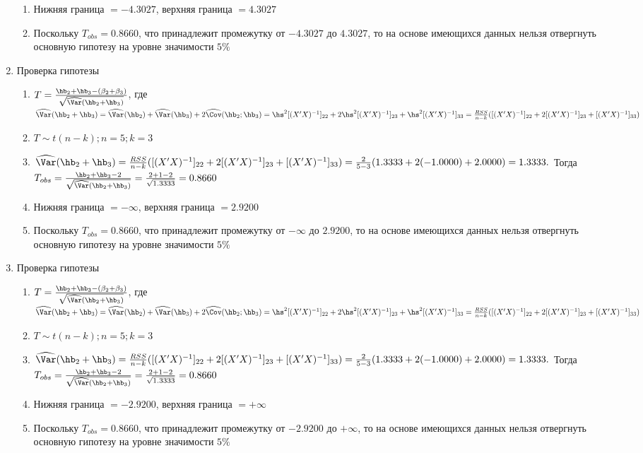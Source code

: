 \documentclass[pdftex,11pt,openany]{book}\usepackage[]{graphicx}\usepackage[]{color}
\begin{document}
\begin{solution}
\begin{enumerate}
\begin{enumerate}
\item Нижняя граница $= - 4.3027$, верхняя граница $= 4.3027$
\item Поскольку $T_{obs} = 0.8660$, что принадлежит промежутку от $- 4.3027$ до $4.3027$, то на основе имеющихся данных нельзя отвергнуть основную гипотезу на уровне значимости $5\%$
\end{enumerate}
\item Проверка гипотезы
\begin{enumerate}
\item $T = \frac{\hb_2 + \hb_3 - (\beta_2 + \beta_3)}{\sqrt{\widehat{\Var}(\hb_2 + \hb_3)}}$, где $\widehat{\Var}(\hb_2 + \hb_3) = \widehat{\Var}(\hb_2) + \widehat{\Var}(\hb_3) + 2\widehat{\Cov}(\hb_2;\hb_3) = \hs^2 [(X'X)^{-1}]_{22} + 2\hs^2 [(X'X)^{-1}]_{23} + \hs^2 [(X'X)^{-1}]_{33}= \frac{RSS}{n - k}([(X'X)^{-1}]_{22} + 2[(X'X)^{-1}]_{23} + [(X'X)^{-1}]_{33})$
\item $T \sim t(n-k); n = 5; k = 3$
\item $\widehat{\Var}(\hb_2 + \hb_3) = \frac{RSS}{n - k}([(X'X)^{-1}]_{22} + 2[(X'X)^{-1}]_{23} + [(X'X)^{-1}]_{33}) = \frac{2}{5 - 3} (1.3333 + 2(-1.0000) + 2.0000) = 1.3333.$ Тогда $T_{obs} = \frac{\hb_2 + \hb_3 - 2}{\sqrt{\widehat{\Var}(\hb_2 + \hb_3)}} = \frac{2 + 1 - 2}{\sqrt{1.3333}} = 0.8660$
\item Нижняя граница $= - \infty$, верхняя граница $= 2.9200$
\item Поскольку $T_{obs} = 0.8660$, что принадлежит промежутку от $- \infty$ до $2.9200$, то на основе имеющихся данных нельзя отвергнуть основную гипотезу на уровне значимости $5\%$
\end{enumerate}
\item Проверка гипотезы
\begin{enumerate}
\item $T = \frac{\hb_2 + \hb_3 - (\beta_2 + \beta_3)}{\sqrt{\widehat{\Var}(\hb_2 + \hb_3)}}$, где $\widehat{\Var}(\hb_2 + \hb_3) = \widehat{\Var}(\hb_2) + \widehat{\Var}(\hb_3) + 2\widehat{\Cov}(\hb_2;\hb_3) = \hs^2 [(X'X)^{-1}]_{22} + 2\hs^2 [(X'X)^{-1}]_{23} + \hs^2 [(X'X)^{-1}]_{33}= \frac{RSS}{n - k}([(X'X)^{-1}]_{22} + 2[(X'X)^{-1}]_{23} + [(X'X)^{-1}]_{33})$
\item $T \sim t(n-k); n = 5; k = 3$
\item $\widehat{\Var}(\hb_2 + \hb_3) = \frac{RSS}{n - k}([(X'X)^{-1}]_{22} + 2[(X'X)^{-1}]_{23} + [(X'X)^{-1}]_{33}) = \frac{2}{5 - 3} (1.3333 + 2(-1.0000) + 2.0000) = 1.3333.$ Тогда $T_{obs} = \frac{\hb_2 + \hb_3 - 2}{\sqrt{\widehat{\Var}(\hb_2 + \hb_3)}} = \frac{2 + 1 - 2}{\sqrt{1.3333}} = 0.8660$
\item Нижняя граница $= - 2.9200$, верхняя граница $= + \infty$
\item Поскольку $T_{obs} = 0.8660$, что принадлежит промежутку от $-  2.9200$ до $+ \infty$, то на основе имеющихся данных нельзя отвергнуть основную гипотезу на уровне значимости $5\%$
\end{enumerate}
\end{enumerate}
\end{solution}
\end{document}
